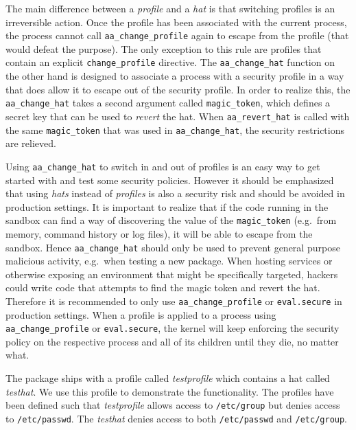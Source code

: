 The main difference between a \emph{profile} and a \emph{hat} is that switching
profiles is an irreversible action. Once the profile has been associated with
the current process, the process cannot call \texttt{aa\_change\_profile} again
to escape from the profile (that would defeat the purpose). The only exception
to this rule are profiles that contain an explicit \texttt{change\_profile}
directive. The \texttt{aa\_change\_hat} function on the other hand is designed to
associate a process with a security profile in a way that does allow it to escape
out of the security profile. In order to realize this, the
\texttt{aa\_change\_hat} takes a second argument called \texttt{magic\_token},
which defines a secret key that can be used to \emph{revert} the hat. When
\texttt{aa\_revert\_hat} is called with the same \texttt{magic\_token} that
was used in \texttt{aa\_change\_hat}, the security restrictions are
relieved.

Using \texttt{aa\_change\_hat} to switch in and out of profiles is an easy way
to get started with \RAppArmor and test some security policies. However it
should be emphasized that using \emph{hats} instead of \emph{profiles} is also a
security risk and should be avoided in production settings. It is important to
realize that if the code running in the sandbox can find a way of discovering
the value of the \texttt{magic\_token} (e.g.\ from memory, command history or log
files), it will be able to escape from the sandbox. Hence
\texttt{aa\_change\_hat} should only be used to prevent general purpose
malicious activity, e.g.\ when testing a new \R package. When hosting services
or otherwise exposing an environment that might be specifically targeted,
hackers could write code that attempts to find the magic token and revert the
hat. Therefore it is recommended to only use \texttt{aa\_change\_profile} or
\texttt{eval.secure} in production settings. When a profile is applied to a
process using \texttt{aa\_change\_profile} or \texttt{eval.secure}, the kernel
will keep enforcing the security policy on the respective process and all of its
children until they die, no matter what.

The \RAppArmor package ships with a profile called \emph{testprofile} which
contains a hat called \emph{testhat}. We use this profile to demonstrate the
functionality. The profiles have been defined such that \emph{testprofile}
allows access to \texttt{/etc/group} but denies access to \texttt{/etc/passwd}.
The \emph{testhat} denies access to both \texttt{/etc/passwd} and
\texttt{/etc/group}.

